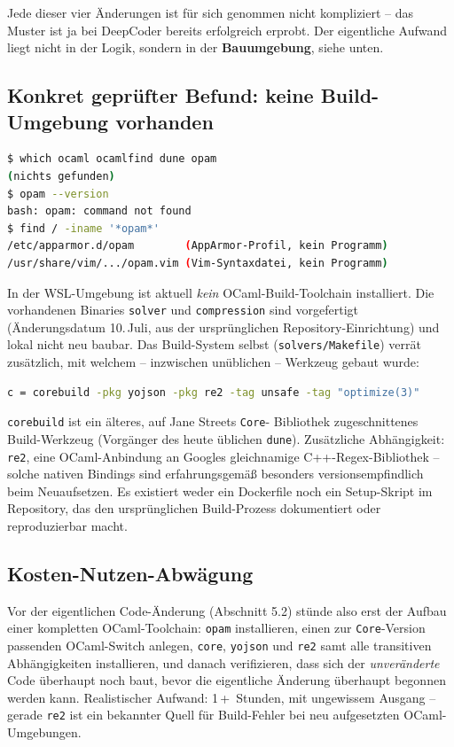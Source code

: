 \documentclass[11pt,a4paper]{article}
\begin{document}
Jede dieser vier Änderungen ist für sich genommen nicht kompliziert --
das Muster ist ja bei DeepCoder bereits erfolgreich erprobt. Der
eigentliche Aufwand liegt nicht in der Logik, sondern in der
\textbf{Bauumgebung}, siehe unten.

\subsection{Konkret geprüfter Befund: keine Build-Umgebung vorhanden}

\begin{lstlisting}[language=bash]
$ which ocaml ocamlfind dune opam
(nichts gefunden)
$ opam --version
bash: opam: command not found
$ find / -iname '*opam*'
/etc/apparmor.d/opam        (AppArmor-Profil, kein Programm)
/usr/share/vim/.../opam.vim (Vim-Syntaxdatei, kein Programm)
\end{lstlisting}

In der WSL-Umgebung ist aktuell \emph{kein} OCaml-Build-Toolchain
installiert. Die vorhandenen Binaries \texttt{solver} und
\texttt{compression} sind vorgefertigt (Änderungsdatum 10.\,Juli, aus der
ursprünglichen Repository-Einrichtung) und lokal nicht neu baubar. Das
Build-System selbst (\texttt{solvers/Makefile}) verrät zusätzlich, mit
welchem -- inzwischen unüblichen -- Werkzeug gebaut wurde:

\begin{lstlisting}[language=bash]
c = corebuild -pkg yojson -pkg re2 -tag unsafe -tag "optimize(3)"
\end{lstlisting}

\texttt{corebuild} ist ein älteres, auf Jane Streets \texttt{Core}-
Bibliothek zugeschnittenes Build-Werkzeug (Vorgänger des heute üblichen
\texttt{dune}). Zusätzliche Abhängigkeit: \texttt{re2}, eine
OCaml-Anbindung an Googles gleichnamige C++-Regex-Bibliothek -- solche
nativen Bindings sind erfahrungsgemäß besonders versionsempfindlich beim
Neuaufsetzen. Es existiert weder ein Dockerfile noch ein Setup-Skript im
Repository, das den ursprünglichen Build-Prozess dokumentiert oder
reproduzierbar macht.

\subsection{Kosten-Nutzen-Abwägung}

Vor der eigentlichen Code-Änderung (Abschnitt 5.2) stünde also erst der
Aufbau einer kompletten OCaml-Toolchain: \texttt{opam} installieren,
einen zur \texttt{Core}-Version passenden OCaml-Switch anlegen,
\texttt{core}, \texttt{yojson} und \texttt{re2} samt alle transitiven
Abhängigkeiten installieren, und danach verifizieren, dass sich der
\emph{unveränderte} Code überhaupt noch baut, bevor die eigentliche
Änderung überhaupt begonnen werden kann. Realistischer Aufwand: 1\,+\,
Stunden, mit ungewissem Ausgang -- gerade \texttt{re2} ist ein bekannter
Quell für Build-Fehler bei neu aufgesetzten OCaml-Umgebungen.
\end{document}
